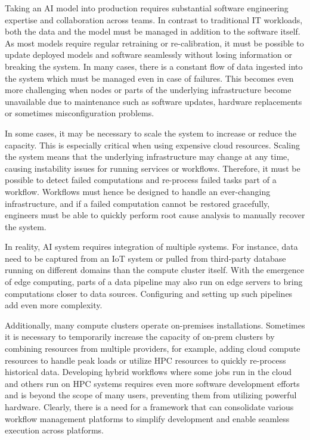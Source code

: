 \documentclass{article}
\begin{document}
Taking an AI model into production requires substantial software engineering expertise and collaboration across teams. In contrast to traditional IT workloads, both the data and the model must be managed in addition to the software itself. As most models require regular retraining or re-calibration, it must be possible to update deployed models and software seamlessly without losing information or breaking the system. In many cases, there is a constant flow of data ingested into the system which must be managed even in case of failures. This becomes even more challenging when nodes or parts of the underlying infrastructure become unavailable due to maintenance such as software updates, hardware replacements or sometimes misconfiguration problems.

In some cases, it may be necessary to scale the system to increase or reduce the capacity. This is especially critical when using expensive cloud resources. Scaling the system means that the underlying infrastructure may change at any time, causing instability issues for running services or workflows. Therefore, it must be possible to detect failed computations and re-process failed tasks part of a workflow. Workflows must hence be designed to handle an ever-changing infrastructure, and if a failed computation cannot be restored gracefully, engineers must be able to quickly perform root cause analysis to manually recover the system.

In reality, AI system requires integration of multiple systems. For instance, data need to be captured from an IoT system or pulled from third-party database running on different domains than the compute cluster itself. With the emergence of edge computing, parts of a data pipeline may also run on edge servers to bring computations closer to data sources. Configuring and setting up such pipelines add even more complexity. 

Additionally, many compute clusters operate on-premises installations. Sometimes it is necessary to temporarily increase the capacity of on-prem clusters by combining resources from multiple providers, for example, adding cloud compute resources to handle peak loads or utilize HPC resources to quickly re-process historical data. Developing hybrid workflows where some jobs run in the cloud and others run on HPC systems requires even more software development efforts \cite{wf_challenges} and is beyond the scope of many users, preventing them from utilizing powerful hardware. Clearly, there is a need for a framework that can consolidate various workflow management platforms to simplify development and enable seamless execution across platforms.
\end{document}
